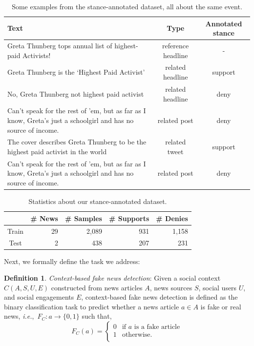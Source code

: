 \documentclass[sigconf,anonymous]{acmart}
\theoremstyle{definition}
\newtheorem{definition}{Definition}[section]
\theoremstyle{hypothesis}
\begin{document}
\begin{table}[tbh]
  \centering
  \small
    \caption{Some examples from the stance-annotated dataset, all about the same event.}
  \begin{tabular}{lcc}
  \toprule
    \bf Text & \bf Type & \bf Annotated stance \\ \midrule
  Greta Thunberg tops annual list of highest-paid Activists! & reference headline & - \\
  Greta Thunberg is the ‘Highest Paid Activist’ & related headline & support \\
  No, Greta Thunberg not highest paid activist & related headline & deny \\
  Can't speak for the rest of 'em, but as far as I know, Greta's just a schoolgirl and has no source of income. & related post & deny \\
  The cover describes Greta Thunberg to be the highest paid activist in the world & related tweet & support \\
  Can't speak for the rest of 'em, but as far as I know, Greta's just a schoolgirl and has no source of income. & related post & deny \\ \bottomrule
  \end{tabular}
  \label{table:stance_annotation}
\end{table}

\begin{table}[t]
  \centering
  \small
  \caption{Statistics about our stance-annotated dataset.}
  \begin{tabular}{crrrr}
  \toprule
    & \bf \# News & \bf \# Samples & \bf \# Supports & \bf \# Denies \\ 
    \midrule
  Train & 29 & 2,089 & 931 & 1,158 \\
  Test & 2 & 438 & 207 & 231 \\ 
  \bottomrule
  \end{tabular}
  \label{table:stance_statistics}
\end{table}

Next, we formally define the task we address:
\begin{definition}{\textit{Context-based fake news detection}}: Given a social context $C(A,S,U,E)$ constructed from news articles $A$, news sources $S$, social users $U$, and social engagements $E$, context-based fake news detection is defined as the binary classification task to predict whether a news article $a\in A$ is fake or real news, \textit{i.e.},~$F_C : a \rightarrow \{0,1\}$ such that,
\[  F_C(a) = \left\{
\begin{array}{ll}
      0 & \textrm{if } a \textrm{ is a fake article} \\
      1 & \textrm{otherwise}. \\
\end{array} 
\right. \]
\end{definition}
\end{document}

